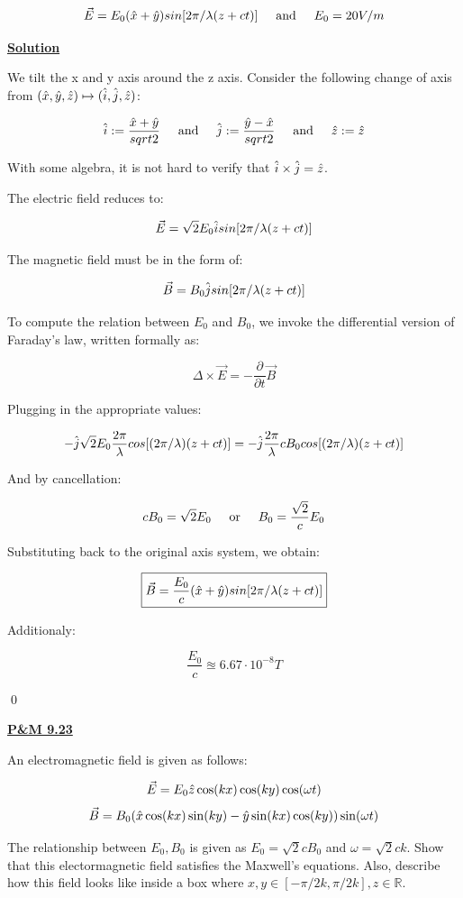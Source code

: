 \documentclass{article}
\newcommand{\new}[1]{
    \vspace{2mm}
    \noindent
    \textbf{
    \underline{#1}}
}
\newcommand{\textOr}{
    {
        \hspace{5mm}
        \textrm{or}
        \hspace{5mm}
    }
}
\newcommand{\textAnd}{
    {
        \hspace{5mm}
        \textrm{and}
        \hspace{5mm}
    }
}
\newcommand{\parderiv}[1]{{
    \frac{\partial}{\partial{#1}}
}
}
\begin{document}
\[
    \vec{E} = 
    E_0(\hx+\hy)sin[2\pi/\lambda(z+ct)]
    \textAnd
    E_0 = 20V/m
\]

\new{Solution}
We tilt the x and y axis around the 
z axis. Consider the following change of axis 
from $(\hat{x}, \hat{y}, \hat{z}) \mapsto 
(\hat{i}, \hat{j}, \hat{z})$:

\[
    \hi := \frac{\hx + \hy}{sqrt{2}}
    \textAnd
    \hj := \frac{\hy - \hx}{sqrt{2}}
    \textAnd
    \hz := \hz
\]

With some algebra, it is not hard 
to verify that $\hat{i} \times \hat{j} = \hat{z}$. 

The electric field reduces to:


\[
    \vec{E} = 
    \sqrt{2} E_0 \hat{i} sin[2\pi/\lambda(z+ct)]
\]

The magnetic field must be in the form of:

\[
    \vec{B} = 
    B_0 \hat{j} sin[2\pi/\lambda(z+ct)]
\]

To compute the relation between $E_0$ and $B_0$, 
we invoke the differential version of 
Faraday's law, written formally as:

\[
    \Delta \times \vec{E} = -\parderiv{t}\vec{B}
\]

Plugging in the appropriate values:

\[
    -\hat{j} \sqrt{2} E_0 \frac{2\pi}{\lambda}
    cos[(2\pi / \lambda) (z+ct)]
    = 
    -\hat{j}\frac{2\pi}{\lambda} c B_0 cos[(2\pi / \lambda) (z+ct)]
\]

And by cancellation:

\[
    c B_0 = \sqrt{2} E_0 \textOr 
    B_0 = \frac{\sqrt{2}}{c} E_0
\]

Substituting back to the original axis system, 
we obtain:

\[
    \boxed{
    \vec{B}
    = \frac{E_0}{c}(\hat{x}+\hat{y})sin[2\pi/\lambda(z+ct)]
    }
    \]

Additionaly:

\[
    \boxed{
    \frac{E_0}{c} \approxeq 
    6.67 \cdot 10^{-8} T
    }
\]

\qed

\newpage

\new{P\&M 9.23}

An electromagnetic field is 
given as follows:

\[
    \vec{E} = 
    E_0 \hat{z} \cos(kx)\cos(ky)\cos(\omega t)
\]
\[
    \vec{B} = 
    B_0 (\hat{x} \cos(kx)\sin(ky)
    -\hat{y} \sin(kx) \cos(ky)) \sin(\omega t)
\]

The relationship between $E_0, B_0$ is 
given as
$E_0 = \sqrt{2}cB_0$ and $\omega = \sqrt{2}ck$.
Show that this electormagnetic field 
satisfies the Maxwell's equations. 
Also, describe how this field looks 
like inside a box where 
$x, y \in [-\pi/2k, \pi/2k], z \in \mathbb{R}$. 
\end{document}
